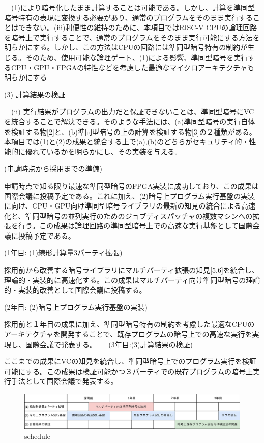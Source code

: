 　(1)により暗号化したまま計算することは可能である。しかし、計算を準同型暗号特有の表現に変換する必要があり、通常のプログラムをそのまま実行することはできない。(iii)利便性の維持のために、本項目ではRISC-V CPUの論理回路を暗号上で実行することで、通常のプログラムをそのまま実行可能にする方法を明らかにする。しかし、この方法はCPUの回路には準同型暗号特有の制約が生じる。そのため、使用可能な論理ゲート、(1)による影響、準同型暗号を実行するCPU・GPU・FPGAの特性などを考慮した最適なマイクロアーキテクチャも明らかにする

(3)	計算結果の検証

　(ii) 実行結果がプログラムの出力だと保証できないことは、準同型暗号にVCを統合することで解決できる。そのような手法には、(a)準同型暗号の実行自体を検証する物[2]と、(b)準同型暗号の上の計算を検証する物[3]の２種類がある。本項目では(1)と(2)の成果と統合する上で(a),(b)のどちらがセキュリティ的・性能的に優れているかを明らかにし、その実装を与える。


\noindent(申請時点から採用までの準備)

申請時点で知る限り最速な準同型暗号のFPGA実装に成功しており、この成果は国際会議に投稿予定である。これに加え、(2)暗号上プログラム実行基盤の実装に向け、CPU・GPU向け準同型暗号ライブラリの最新の知見の統合による高速化と、準同型暗号の並列実行のためのジョブディスパッチャの複数マシンへの拡張を行う。この成果は論理回路の準同型暗号上での高速な実行基盤として国際会議に投稿予定である。

\noindent(1年目: (1)線形計算量3パーティ拡張)

採用前から改善する暗号ライブラリにマルチパーティ拡張の知見[5,6]を統合し、理論的・実装的に高速化する。この成果はマルチパーティ向け準同型暗号の理論的・実装的改善として国際会議に投稿する。

\noindent(2年目: (2)暗号上プログラム実行基盤の実装)

採用前と１年目の成果に加え、準同型暗号特有の制約を考慮した最適なCPUのアーキテクチャを開発することで、既存プログラムの暗号上での高速な実行を実現し、国際会議で発表する。
　
\noindent(3年目:(3)計算結果の検証)

ここまでの成果にVCの知見を統合し、準同型暗号上でのプログラム実行を検証可能にする。この成果は検証可能かつ３パーティでの既存プログラムの暗号上実行手法として国際会議で発表する。

\begin{figure}[h]
    \centering
    \includegraphics[width=\linewidth]{figures/schedule.drawio.png}
    \vspace*{-1cm}
    \caption{schedule}
    \label{fig:schedule}
\end{figure}

